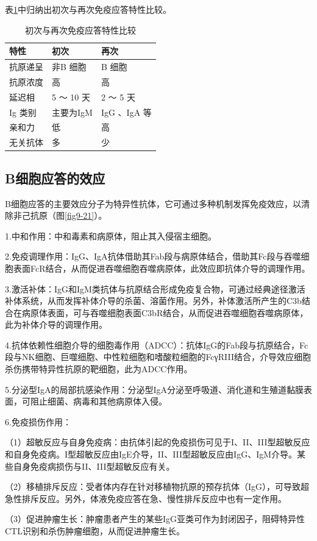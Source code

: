 表\ref{tab9-1}中归纳出初次与再次免疫应答特性比较。

\begin{longtable}[]{@{}lll@{}}
    \caption{初次与再次免疫应答特性比较}
    \label{tab9-1}\\
\toprule
特性 & 初次 & 再次\tabularnewline
\midrule
\endhead
抗原递呈 & 非B 细胞 & B 细胞\tabularnewline
抗原浓度 & 高 & 高\tabularnewline
延迟相 & 5 ～ 10 天 & 2 ～ 5 天\tabularnewline
Ig 类别 & 主要为IgM & IgG 、IgA 等\tabularnewline
亲和力 & 低 & 高\tabularnewline
无关抗体 & 多 & 少\tabularnewline
\bottomrule
\end{longtable}


\subsection{B细胞应答的效应}

B细胞应答的主要效应分子为特异性抗体，它可通过多种机制发挥免疫效应，以清除非己抗原（图\ref{fig9-21}）。

1.中和作用：中和毒素和病原体，阻止其入侵宿主细胞。

2.免疫调理作用：IgG、IgA抗体借助其Fab段与病原体结合，借助其Fc段与吞噬细胞表面FcR结合，从而促进吞噬细胞吞噬病原体，此效应即抗体介导的调理作用。

3.激活补体：IgG和IgM类抗体与抗原结合形成免疫复合物，可通过经典途径激活补体系统，从而发挥补体介导的杀菌、溶菌作用。另外，补体激活所产生的C3b结合在病原体表面，可与吞噬细胞表面C3bR结合，从而促进吞噬细胞吞噬病原体，此为补体介导的调理作用。

4.抗体依赖性细胞介导的细胞毒作用（ADCC）：抗体IgG的Fab段与抗原结合，Fc段与NK细胞、巨噬细胞、中性粒细胞和嗜酸粒细胞的FcγRIII结合，介导效应细胞杀伤携带特异性抗原的靶细胞，此为ADCC作用。

5.分泌型IgA的局部抗感染作用：分泌型IgA分泌至呼吸道、消化道和生殖道黏膜表面，可阻止细菌、病毒和其他病原体入侵。

6.免疫损伤作用：

（1）超敏反应与自身免疫病：由抗体引起的免疫损伤可见于I、II、III型超敏反应和自身免疫病。I型超敏反应由IgE介导，II、III型超敏反应由IgG、IgM介导。某些自身免疫病损伤与II、III型超敏反应有关。

（2）移植排斥反应：受者体内存在针对移植物抗原的预存抗体（IgG），可导致超急性排斥反应。另外，体液免疫应答在急、慢性排斥反应中也有一定作用。

（3）促进肿瘤生长：肿瘤患者产生的某些IgG亚类可作为封闭因子，阻碍特异性CTL识别和杀伤肿瘤细胞，从而促进肿瘤生长。

